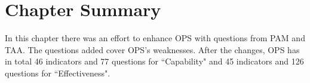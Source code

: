 

\section{Chapter Summary}
In this chapter there was an effort to enhance \ac{OPS} with questions from \ac{PAM} and \ac{TAA}. The questions added cover \ac{OPS}'s weaknesses. After the changes, \ac{OPS} has in total 46 indicators and 77 questions for ``Capability" and 45 indicators and 126 questions for ``Effectiveness".










